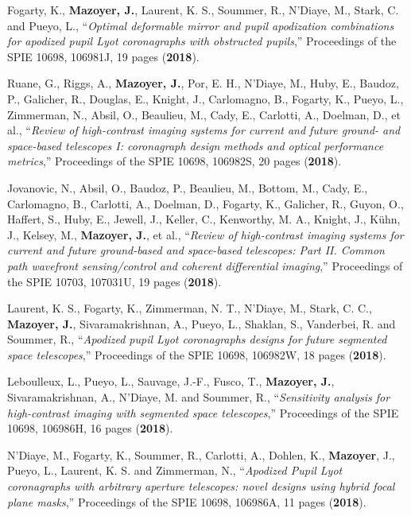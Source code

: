 \documentclass[11pt,a4paper, french]{article}
\begin{document}
\begin{etaremune}
\item Fogarty, K., \textbf{Mazoyer, J.}, Laurent, K. S., Soummer, R., N’Diaye, M., Stark, C. and Pueyo, L., “\textit{Optimal deformable mirror and pupil apodization combinations for apodized pupil Lyot coronagraphs with obstructed pupils},” Proceedings of the SPIE 10698, 106981J, 19 pages (\textbf{2018}).
\item Ruane, G., Riggs, A., \textbf{Mazoyer, J.}, Por, E. H., N’Diaye, M., Huby, E., Baudoz, P., Galicher, R., Douglas, E., Knight, J., Carlomagno, B., Fogarty, K., Pueyo, L., Zimmerman, N., Absil, O., Beaulieu, M., Cady, E., Carlotti, A., Doelman, D., et al., “\textit{Review of high-contrast imaging systems for current and future ground- and space-based telescopes I: coronagraph design methods and optical performance metrics},” Proceedings of the SPIE 10698, 106982S, 20 pages (\textbf{2018}).
\item Jovanovic, N., Absil, O., Baudoz, P., Beaulieu, M., Bottom, M., Cady, E., Carlomagno, B., Carlotti, A., Doelman, D., Fogarty, K., Galicher, R., Guyon, O., Haffert, S., Huby, E., Jewell, J., Keller, C., Kenworthy, M. A., Knight, J., Kühn, J., Kelsey, M., \textbf{Mazoyer, J.}, et al., “\textit{Review of high-contrast imaging systems for current and future ground-based and space-based telescopes: Part II. Common path wavefront sensing/control and coherent differential imaging},” Proceedings of the SPIE 10703, 107031U, 19 pages (\textbf{2018}).
\item Laurent, K. S., Fogarty, K., Zimmerman, N. T., N’Diaye, M., Stark, C. C., \textbf{Mazoyer, J.}, Sivaramakrishnan, A., Pueyo, L., Shaklan, S., Vanderbei, R. and Soummer, R., “\textit{Apodized pupil Lyot coronagraphs designs for future segmented space telescopes},” Proceedings of the SPIE 10698, 106982W, 18 pages (\textbf{2018}).
\item Leboulleux, L., Pueyo, L., Sauvage, J.-F., Fusco, T., \textbf{Mazoyer, J.}, Sivaramakrishnan, A., N’Diaye, M. and Soummer, R., “\textit{Sensitivity analysis for high-contrast imaging with segmented space telescopes},” Proceedings of the SPIE 10698, 106986H, 16 pages (\textbf{2018}).
\item N’Diaye, M., Fogarty, K., Soummer, R., Carlotti, A., Dohlen, K., \textbf{Mazoyer}, J., Pueyo, L., Laurent, K. S. and Zimmerman, N., “\textit{Apodized Pupil Lyot coronagraphs with arbitrary aperture telescopes: novel designs using hybrid focal plane masks},” Proceedings of the SPIE 10698, 106986A, 11 pages (\textbf{2018}).

\end{etaremune}
\end{document}
